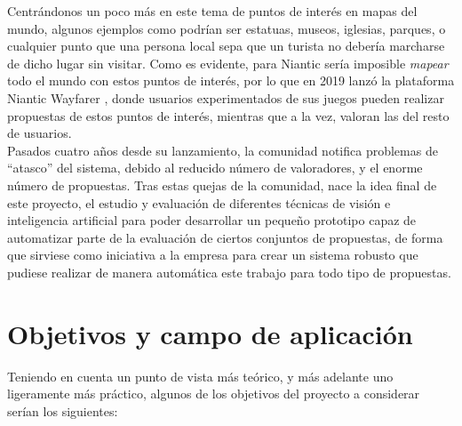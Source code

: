 \documentclass[12pt]{article}
\begin{document}
		Centrándonos un poco más en este tema de puntos de interés en mapas del mundo, algunos ejemplos como podrían ser estatuas, museos, iglesias, parques, o cualquier punto que una persona local sepa que un turista no debería marcharse de dicho lugar sin visitar. Como es evidente, para Niantic sería imposible \textit{mapear} todo el mundo con estos puntos de interés, por lo que en 2019 lanzó la plataforma Niantic Wayfarer \cite{wayfarer}, donde usuarios experimentados de sus juegos pueden realizar propuestas de estos puntos de interés, mientras que a la vez, valoran las del resto de usuarios. \\
		
		Pasados cuatro años desde su lanzamiento, la comunidad notifica problemas de ``atasco'' del sistema, debido al reducido número de valoradores, y el enorme número de propuestas. Tras estas quejas de la comunidad, nace la idea final de este proyecto, el estudio y evaluación de diferentes técnicas de visión e inteligencia artificial para poder desarrollar un pequeño prototipo capaz de automatizar parte de la evaluación de ciertos conjuntos de propuestas, de forma que sirviese como iniciativa a la empresa para crear un sistema robusto que pudiese realizar de manera automática este trabajo para todo tipo de propuestas. 
	
	\section{Objetivos y campo de aplicación}
	
		Teniendo en cuenta un punto de vista más teórico, y más adelante uno ligeramente más práctico, algunos de los objetivos del proyecto a considerar serían los siguientes: 
		
\end{document}
